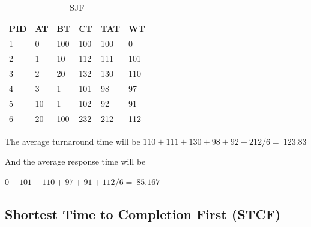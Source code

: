 \documentclass[11pt,a4paper]{article}
\theoremstyle{plain}
\theoremstyle{definition}
\theoremstyle{remark}
\numberwithin{equation}{section}
\begin{document}
\begin{table}[H]
	\centering
	\caption{SJF}
	\label{t2-sjf}
	\begin{tabular}{llllll}
		\hline
		\multicolumn{1}{|l|}{PID} & \multicolumn{1}{l|}{AT} & \multicolumn{1}{l|}{BT} & \multicolumn{1}{l|}{CT} & \multicolumn{1}{l|}{TAT} & \multicolumn{1}{l|}{WT} \\ \hline
		1                         & 0                       & 100                     & 100                     & 100                      & 0                       \\
		2                         & 1                       & 10                      & 112                     & 111                      & 101                     \\
		3                         & 2                       & 20                      & 132                     & 130                      & 110                     \\
		4                         & 3                       & 1                       & 101                     & 98                       & 97                      \\
		5                         & 10                      & 1                       & 102                     & 92                       & 91                      \\
		6                         & 20                      & 100                     & 232                     & 212                      & 112                    
	\end{tabular}
\end{table}


The average turnaround time will be $110+111+130+98+92+212/6=~123.83$

And the average response time will be

$0+101+110+97+91+112/6=~85.167$


\subsection*{Shortest Time to Completion First (STCF)}
\end{document}
